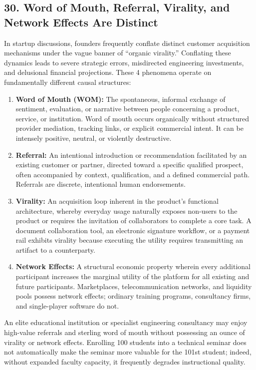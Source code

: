 \subsection*{30. Word of Mouth, Referral, Virality, and Network Effects Are Distinct}

In startup discussions, founders frequently conflate distinct customer acquisition mechanisms under the vague banner of ``organic virality.'' Conflating these dynamics leads to severe strategic errors, misdirected engineering investments, and delusional financial projections. These 4 phenomena operate on fundamentally different causal structures:

\begin{enumerate}[leftmargin=*]
\item \textbf{Word of Mouth (WOM):} The spontaneous, informal exchange of sentiment, evaluation, or narrative between people concerning a product, service, or institution. Word of mouth occurs organically without structured provider mediation, tracking links, or explicit commercial intent. It can be intensely positive, neutral, or violently destructive.
\item \textbf{Referral:} An intentional introduction or recommendation facilitated by an existing customer or partner, directed toward a specific qualified prospect, often accompanied by context, qualification, and a defined commercial path. Referrals are discrete, intentional human endorsements.
\item \textbf{Virality:} An acquisition loop inherent in the product's functional architecture, whereby everyday usage naturally exposes non-users to the product or requires the invitation of collaborators to complete a core task. A document collaboration tool, an electronic signature workflow, or a payment rail exhibits virality because executing the utility requires transmitting an artifact to a counterparty.
\item \textbf{Network Effects:} A structural economic property wherein every additional participant increases the marginal utility of the platform for all existing and future participants. Marketplaces, telecommunication networks, and liquidity pools possess network effects; ordinary training programs, consultancy firms, and single-player software do not.
\end{enumerate}

An elite educational institution or specialist engineering consultancy may enjoy high-value referrals and sterling word of mouth without possessing an ounce of virality or network effects. Enrolling 100 students into a technical seminar does not automatically make the seminar more valuable for the 101st student; indeed, without expanded faculty capacity, it frequently degrades instructional quality. 

